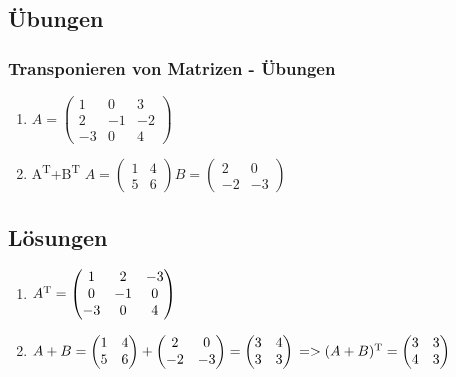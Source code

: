 \subsection{Übungen}
\begin{frame}
\frametitle{Transponieren von Matrizen - Übungen}
\begin{enumerate}
\item $A = \begin{pmatrix}
1 & 0 & 3\\
2 & -1 & -2\\
-3 & 0 & 4
\end{pmatrix}$
\item A\textsuperscript{T}+B\textsuperscript{T}
$A = \begin{pmatrix}
1 & 4 \\
5 & 6
\end{pmatrix}
B = \begin{pmatrix}
2 & 0\\
-2 & -3
\end{pmatrix}$
\end{enumerate}
\end{frame}


\subsection{Lösungen}
\begin{frame}
\begin{enumerate}
\item $A\textsuperscript{T} = \begin{pmatrix}
1 & 2 & -3\\
0 & -1 & 0\\
-3 & 0 & 4
\end{pmatrix}$
\item $A + B = \begin{pmatrix}
1 & 4\\
5 & 6
\end{pmatrix} + \begin{pmatrix}
2 & 0\\
-2 & -3
\end{pmatrix} = \begin{pmatrix}
3 & 4\\
3 & 3
\end{pmatrix} 
\newline
=> (A+B)\textsuperscript{T} = \begin{pmatrix}
3 & 3\\
4 & 3
\end{pmatrix}$
\end{enumerate}
\end{frame}

